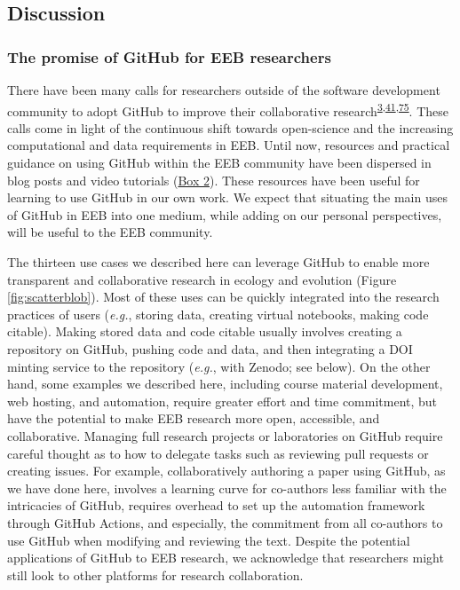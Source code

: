 \hypertarget{discussion}{%
\subsection{Discussion}\label{discussion}}

\hypertarget{the-promise-of-github-for-eeb-researchers}{%
\subsubsection{The promise of GitHub for EEB researchers}\label{the-promise-of-github-for-eeb-researchers}}

There have been many calls for researchers outside of the software development community to adopt GitHub to improve their collaborative research\textsuperscript{\protect\hyperlink{ref-10ghgV3S8}{3},\protect\hyperlink{ref-1Du6fzB8g}{41},\protect\hyperlink{ref-UsTxAq4f}{75}}.
These calls come in light of the continuous shift towards open-science and the increasing computational and data requirements in EEB.
Until now, resources and practical guidance on using GitHub within the EEB community have been dispersed in blog posts and video tutorials (\protect\hyperlink{tips}{Box 2}).
These resources have been useful for learning to use GitHub in our own work.
We expect that situating the main uses of GitHub in EEB into one medium, while adding on our personal perspectives, will be useful to the EEB community.

The thirteen use cases we described here can leverage GitHub to enable more transparent and collaborative research in ecology and evolution (Figure \ref{fig:scatterblob}).
Most of these uses can be quickly integrated into the research practices of users (\emph{e.g.}, storing data, creating virtual notebooks, making code citable).
Making stored data and code citable usually involves creating a repository on GitHub, pushing code and data, and then integrating a DOI minting service to the repository (\emph{e.g.}, with Zenodo; see below).
On the other hand, some examples we described here, including course material development, web hosting, and automation, require greater effort and time commitment, but have the potential to make EEB research more open, accessible, and collaborative.
Managing full research projects or laboratories on GitHub require careful thought as to how to delegate tasks such as reviewing pull requests or creating issues.
For example, collaboratively authoring a paper using GitHub, as we have done here, involves a learning curve for co-authors less familiar with the intricacies of GitHub, requires overhead to set up the automation framework through GitHub Actions, and especially, the commitment from all co-authors to use GitHub when modifying and reviewing the text.
Despite the potential applications of GitHub to EEB research, we acknowledge that researchers might still look to other platforms for research collaboration.

